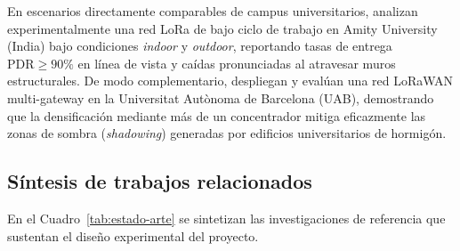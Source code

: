 \documentclass[12pt,oneside,openany,spanish,oldfontcommands]{memoir}
\begin{document}
En escenarios directamente comparables de campus universitarios, \textcite{kaur2024campus}
analizan experimentalmente una red LoRa de bajo ciclo de trabajo en Amity University (India) bajo
condiciones \textit{indoor} y \textit{outdoor}, reportando tasas de entrega $\text{PDR} \geq 90\%$
en línea de vista y caídas pronunciadas al atravesar muros estructurales. De modo complementario,
\textcite{barrachina2023campus} despliegan y evalúan una red LoRaWAN multi-gateway en la
Universitat Autònoma de Barcelona (UAB), demostrando que la densificación mediante más de un
concentrador mitiga eficazmente las zonas de sombra (\textit{shadowing}) generadas por edificios
universitarios de hormigón.

\subsection{Síntesis de trabajos relacionados}

En el Cuadro~\ref{tab:estado-arte} se sintetizan las investigaciones de referencia que sustentan
el diseño experimental del proyecto.
\end{document}
